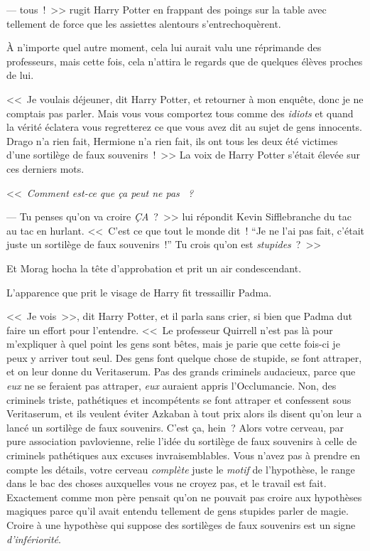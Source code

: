 ---  tous~!~>> rugit Harry Potter en frappant des poings sur la table avec tellement de force que les assiettes alentours s'entrechoquèrent.

À n'importe quel autre moment, cela lui aurait valu une réprimande des professeurs, mais cette fois, cela n'attira le regards que de quelques élèves proches de lui.

<<~Je voulais déjeuner, dit Harry Potter, et retourner à mon enquête, donc je ne comptais pas parler. Mais vous vous comportez tous comme des \emph{idiots} et quand la vérité éclatera vous regretterez ce que vous avez dit au sujet de gens innocents. Drago n'a rien fait, Hermione n'a rien fait, ils ont tous les deux été victimes d'une sortilège de faux souvenirs~!~>> La voix de Harry Potter s'était élevée sur ces derniers mots.

<<~\emph{Comment est-ce que ça peut ne pas ~?}

--- Tu penses qu'on va croire \emph{ÇA}~?~>> lui répondit Kevin Sifflebranche du tac au tac en hurlant. <<~C'est ce que tout le monde dit~! “Je ne l'ai pas fait, c'était juste un sortilège de faux souvenirs~!” Tu crois qu'on est \emph{stupides}~?~>>

Et Morag hocha la tête d'approbation et prit un air condescendant.

L'apparence que prit le visage de Harry fit tressaillir Padma.

<<~Je vois~>>, dit Harry Potter, et il parla sans crier, si bien que Padma dut faire un effort pour l'entendre. <<~Le professeur Quirrell n'est pas là pour m'expliquer à quel point les gens sont bêtes, mais je parie que cette fois-ci je peux y arriver tout seul. Des gens font quelque chose de stupide, se font attraper, et on leur donne du Veritaserum. Pas des grands criminels audacieux, parce que \emph{eux} ne se feraient pas attraper, \emph{eux} auraient appris l'Occlumancie. Non, des criminels triste, pathétiques et incompétents se font attraper et confessent sous Veritaserum, et ils veulent éviter Azkaban à tout prix alors ils disent qu'on leur a lancé un sortilège de faux souvenirs. C'est ça, hein~? Alors votre cerveau, par pure association pavlovienne, relie l'idée du sortilège de faux souvenirs à celle de criminels pathétiques aux excuses invraisemblables. Vous n'avez pas à prendre en compte les détails, votre cerveau \emph{complète} juste le \emph{motif} de l'hypothèse, le range dans le bac des choses auxquelles vous ne croyez pas, et le travail est fait. Exactement comme mon père pensait qu'on ne pouvait pas croire aux hypothèses magiques parce qu'il avait entendu tellement de gens stupides parler de magie. Croire à une hypothèse qui suppose des sortilèges de faux souvenirs est un signe \emph{d'infériorité}.

